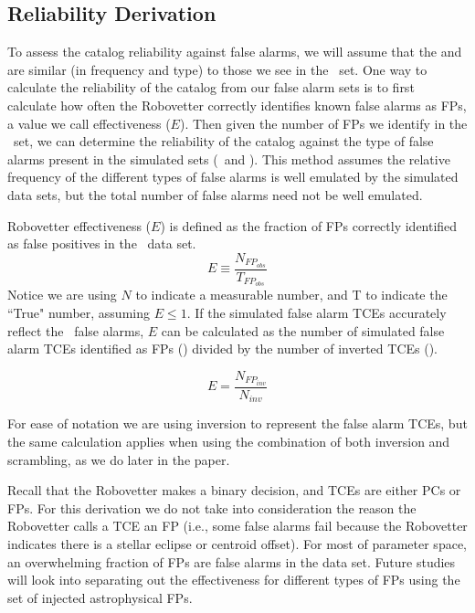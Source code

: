 \subsection{Reliability Derivation}
\label{s:relcalc}
To assess the catalog reliability against false alarms, we will assume that the  and  are similar (in frequency and type) to those we see in the \opstce\ set.  One way to calculate the reliability of the catalog from our false alarm sets is to first calculate how often the Robovetter correctly identifies known false alarms as FPs, a value we call effectiveness ($E$).  Then given the number of FPs we identify in the \opstce\ set, we can determine the reliability of the catalog against the type of false alarms present in the simulated sets (\invtce\ and \scrtce). This method assumes the relative frequency of the different types of false alarms is well emulated by the simulated data sets, but the total number of false alarms need not be well emulated.


Robovetter effectiveness ($E$) is defined as the fraction of FPs correctly identified as false positives in the \opstce\ data set. 
\begin{equation}
\label{effect1}
E \equiv \frac{N_{FP_{obs}}}{T_{FP_{obs}}}
\end{equation}
Notice we are using $N$ to indicate a measurable number, and T to indicate the ``True" number, assuming $E\leq 1 $.  If the simulated false alarm TCEs accurately reflect the \opstce\ false alarms, $E$ can be calculated as the number of simulated false alarm TCEs identified as FPs (\invfp) divided by the number of inverted TCEs (\invN). 

\begin{equation}
\label{effect2}
E = \frac{N_{FP_{inv}}}{N_{inv}}
\end{equation}

For ease of notation we are using inversion to represent the false alarm TCEs, but the same calculation applies when using the combination of both inversion and scrambling, as we do later in the paper. 

{\color{blue}
Recall that the Robovetter makes a binary decision, and TCEs are either PCs or FPs. For this derivation we do not take into consideration the reason the Robovetter calls a TCE an FP (i.e., some false alarms fail because the Robovetter indicates there is a stellar eclipse or centroid offset). For most of parameter space, an overwhelming fraction of FPs are false alarms in the \opstce{} data set. Future studies will look into separating out the effectiveness for different types of FPs using the set of injected astrophysical FPs.
}

